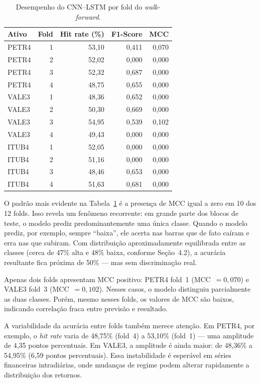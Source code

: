 \begin{table}[htbp]
  \centering
  \caption{Desempenho do CNN--LSTM por fold do \textit{walk-forward}.}
  \label{tab:folds-cnnlstm}
  \begin{tabular}{l r r r r}
    \toprule
    \textbf{Ativo} & \textbf{Fold} & \textbf{Hit rate (\%)} & \textbf{F1-Score} & \textbf{MCC} \\
    \midrule
    PETR4 & 1 & 53,10 & 0,411 & 0,070 \\
    PETR4 & 2 & 52,02 & 0,000 & 0,000 \\
    PETR4 & 3 & 52,32 & 0,687 & 0,000 \\
    PETR4 & 4 & 48,75 & 0,655 & 0,000 \\
    \midrule
    VALE3 & 1 & 48,36 & 0,652 & 0,000 \\
    VALE3 & 2 & 50,30 & 0,669 & 0,000 \\
    VALE3 & 3 & 54,95 & 0,539 & 0,102 \\
    VALE3 & 4 & 49,43 & 0,000 & 0,000 \\
    \midrule
    ITUB4 & 1 & 52,05 & 0,000 & 0,000 \\
    ITUB4 & 2 & 51,16 & 0,000 & 0,000 \\
    ITUB4 & 3 & 48,46 & 0,653 & 0,000 \\
    ITUB4 & 4 & 51,63 & 0,681 & 0,000 \\
    \bottomrule
  \end{tabular}
\end{table}

O padrão mais evidente na Tabela~\ref{tab:folds-cnnlstm} é a presença de MCC igual a zero
em 10 dos 12 folds. Isso revela um fenômeno recorrente: em grande parte dos blocos de teste,
o modelo prediz predominantemente uma única classe. Quando o modelo prediz, por exemplo,
sempre ``baixa'', ele acerta nas barras que de fato caíram e erra nas que subiram. Com
distribuição aproximadamente equilibrada entre as classes (cerca de 47\% alta e 48\% baixa,
conforme Seção~4.2), a acurácia resultante fica próxima de 50\% --- mas sem discriminação real.

Apenas dois folds apresentam MCC positivo: PETR4 fold~1 (MCC~$=0{,}070$) e VALE3 fold~3
(MCC~$=0{,}102$). Nesses casos, o modelo distinguiu parcialmente as duas classes.
Porém, mesmo nesses folds, os valores de MCC são baixos, indicando correlação fraca entre
previsão e resultado.

A variabilidade da acurácia entre folds também merece atenção. Em PETR4, por exemplo,
o \textit{hit rate} varia de 48,75\% (fold~4) a 53,10\% (fold~1) --- uma amplitude de 4,35 pontos
percentuais. Em VALE3, a amplitude é ainda maior: de 48,36\% a 54,95\% (6,59 pontos percentuais).
Essa instabilidade é esperável em séries financeiras intradiárias, onde mudanças de regime
podem alterar rapidamente a distribuição dos retornos.

